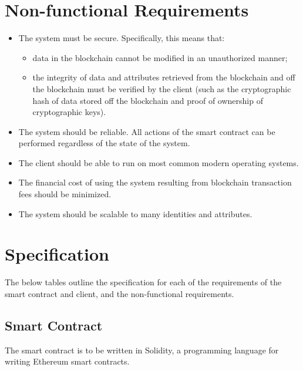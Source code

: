 \documentclass[12pt,a4paper]{report}
\begin{document}
	\section{Non-functional Requirements}
	\begin{itemize}
		\item The system must be secure. Specifically, this means that:
			\begin{itemize}
				\item data in the blockchain cannot be modified in an unauthorized manner;
				\item the integrity of data and attributes retrieved from the blockchain and off the blockchain must be verified by the client (such as the cryptographic hash of data stored off the blockchain and proof of ownership of cryptographic keys).
			\end{itemize}
		\item The system should be reliable. All actions of the smart contract can be performed regardless of the state of the system.
		\item The client should be able to run on most common modern operating systems.
		\item The financial cost of using the system resulting from blockchain transaction fees should be minimized.
		\item The system should be scalable to many identities and attributes.
	\end{itemize}
	
	\section{Specification}
	The below tables outline the specification for each of the requirements of the smart contract and client, and the non-functional requirements.	
	
	\subsection{Smart Contract}
	The smart contract is to be written in Solidity, a programming language for writing Ethereum smart contracts.
	
\end{document}

